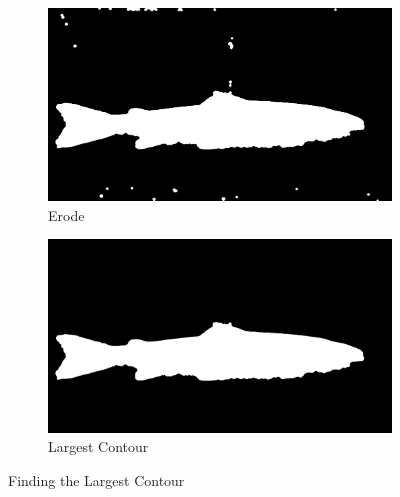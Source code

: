 \begin{figure}[H]
    \medskip
    \begin{subfigure}{0.49\textwidth}
        \includegraphics[width=\linewidth]{images/implementation/4_5_erode}
        \caption{Erode} 
        \label{fig:erode_contour}
    \end{subfigure}\hspace*{\fill}
    \begin{subfigure}{0.49\textwidth}
        \includegraphics[width=\linewidth]{images/implementation/4_largest_contour}
        \caption{Largest Contour} 
        \label{fig:largest_contour_2}
    \end{subfigure}
    \caption{Finding the Largest Contour} 
    \label{fig:find_largest_contour}
\end{figure}


